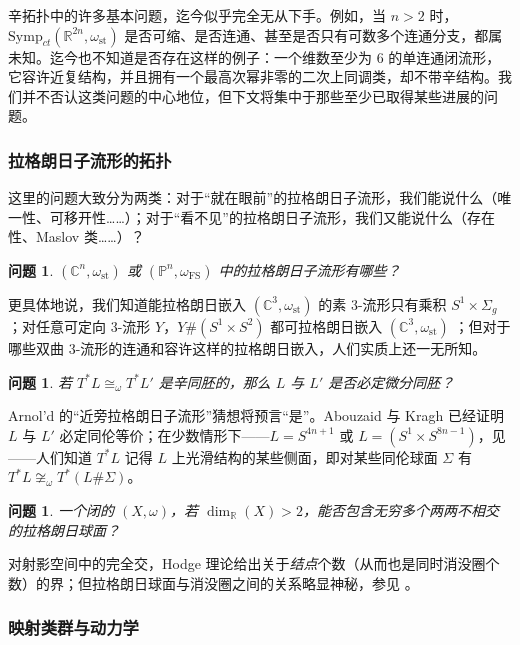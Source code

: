 \documentclass[11pt,a4paper]{article}
\numberwithin{equation}{section}
\newtheorem{Question}[thm]{问题}
\newcommand{\bR}{\mathbb{R}}
\newcommand{\bC}{\mathbb{C}}
\newcommand{\bP}{\mathbb{P}}
\newcommand{\Symp}{\mathrm{Symp}}
\newcommand{\st}{\operatorname{st}}
\begin{document}
辛拓扑中的许多基本问题，迄今似乎完全无从下手。例如，当 $n>2$ 时，$\Symp_{ct}(\bR^{2n}, \omega_{\st})$ 是否可缩、是否连通、甚至是否只有可数多个连通分支，都属未知。迄今也不知道是否存在这样的例子：一个维数至少为 6 的单连通闭流形，它容许近复结构，并且拥有一个最高次幂非零的二次上同调类，却不带辛结构。我们并不否认这类问题的中心地位，但下文将集中于那些至少已取得某些进展的问题。

\subsubsection{拉格朗日子流形的拓扑}

这里的问题大致分为两类：对于“就在眼前”的拉格朗日子流形，我们能说什么（唯一性、可移开性……）；对于“看不见”的拉格朗日子流形，我们又能说什么（存在性、Maslov 类……）？

\begin{Question} $(\bC^n, \omega_{\st})$ 或 $(\bP^n, \omega_{\operatorname{FS}})$ 中的拉格朗日子流形有哪些？ \end{Question}

更具体地说，我们知道能拉格朗日嵌入 $(\bC^3,\omega_{\st})$ 的素 3-流形只有乘积 $S^1\times \Sigma_g$ \cite{Fukaya:LagC3}；对任意可定向 3-流形 $Y$，$Y\#(S^1\times S^2)$ 都可拉格朗日嵌入 $(\bC^3,\omega_{\st})$ \cite{YETI}；但对于哪些双曲 3-流形的连通和容许这样的拉格朗日嵌入，人们实质上还一无所知。

\begin{Question}\label{Q:Arnold} 若 $T^*L \cong_{\omega} T^*L'$ 是辛同胚的，那么 $L$ 与 $L'$ 是否必定微分同胚？ \end{Question}

Arnol'd 的“近旁拉格朗日子流形”猜想将预言“是”。Abouzaid 与 Kragh \cite{Kragh,Abouzaid:Maslov0} 已经证明 $L$ 与 $L'$ 必定同伦等价；在少数情形下——$L=S^{4n+1}$ 或 $L= (S^1\times S^{8n-1})$，见 \cite{Abouzaid:exotic,EkholmSmith}——人们知道 $T^*L$ 记得 $L$ 上光滑结构的某些侧面，即对某些同伦球面 $\Sigma$ 有 $T^*L \not\cong_{\omega} T^*(L\#\Sigma)$。

\begin{Question} 一个闭的 $(X,\omega)$，若 $\dim_{\bR}(X)>2$，能否包含无穷多个两两不相交的拉格朗日球面？ \end{Question}

对射影空间中的完全交，Hodge 理论给出关于\emph{结点}个数（从而也是同时消没圈个数）的界；但拉格朗日球面与消没圈之间的关系略显神秘，参见 \cite{CortiSmith}。

\subsubsection{映射类群与动力学}
\end{document}
